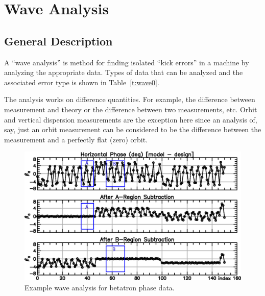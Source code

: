 \chapter{Wave Analysis}
\label{c:wave}


\section{General Description}
\label{s:wave.general}

A ``wave analysis'' is method for finding isolated ``kick errors'' in
a machine by analyzing the appropriate data. Types of data that can be
analyzed and the associated error type is shown in
Table~\ref{t:wave0}.  

The analysis works on difference quantities. For example, the
difference between measurement and theory or the difference between
two measurements, etc. Orbit and vertical dispersion measurements are the
exception here since an analysis of, say, just an orbit measurement can
be considered to be the difference between the measurement and a
perfectly flat (zero) orbit.

\begin{table}[h]
\caption[Wave measurement types.]
{Types of measurements that can be used in a wave analysis and the 
types of errors that can be diagnosed.}
\label{t:wave0}
\end{table}

\begin{figure}[t]
  \centering
  \includegraphics[width=6in]{wave.eps}
  \caption[Example wave analysis.]
{Example wave analysis for betatron phase data.}
  \label{f:wave}
\end{figure}

